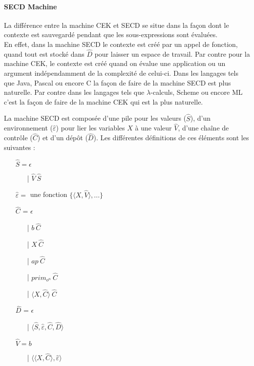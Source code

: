 \documentclass[10pt,a4paper]{report}
\begin{document}
	\newpage
	
	
	\paragraph{SECD Machine}
	
	La différence entre la machine CEK et SECD se situe dans la façon dont le contexte est sauvegardé pendant que les sous-expressions sont évaluées.\\
	En effet, dans la machine SECD le contexte est créé par un appel de fonction, quand tout est stocké dans $\widehat{D}$ pour laisser un espace de travail. Par contre pour la machine CEK, le contexte est créé quand on évalue une application ou un argument indépendamment de la complexité de celui-ci.
	\smallbreak 
	Dans les langages tels que Java, Pascal ou encore C la façon de faire de la machine SECD est plus naturelle. Par contre  dans les langages tels que $\lambda$-calculs, Scheme ou encore ML c'est la façon de faire de la machine CEK qui est la plus naturelle.
	\medbreak
	
	La machine SECD est composée d'une pile pour les valeurs ($\widehat{S}$), d'un environnement ($\widehat{\varepsilon}$) pour lier les variables $X$ à une valeur $\widehat{V}$, d'une chaîne de contrôle ($\widehat{C}$) et d'un dépôt ($\widehat{D}$). Les différentes définitions de ces éléments sont les suivantes :
	\smallbreak
	\begin{itemize}
		\item[] $\widehat{S} = \epsilon$ 
		\begin{itemize}
			\item[|] $\widehat{V}~\widehat{S}$
		\end{itemize}
		\item[] $\widehat{\varepsilon} =$ une fonction $\{\langle X,\widehat{V}\rangle,...\}$
		\item[] $\widehat{C}$ = $\epsilon$ 
		\begin{itemize}
			\item[|] $b~\widehat{C}$
			\item[|] $X~\widehat{C}$
			\item[|] $ap~\widehat{C}$
			\item[|] $prim_{o^{n}}~\widehat{C}$
			\item[|] $\langle X,\widehat{C}\rangle~\widehat{C}$
		\end{itemize}
		\item[] $\widehat{D}$ = $\epsilon$
		\begin{itemize}
			\item[|] $\langle\widehat{S},\widehat{\varepsilon},\widehat{C},\widehat{D}\rangle$
		\end{itemize}
		\item[] $\widehat{V} = b$
		\begin{itemize}
			\item[|] $\langle\langle X,\widehat{C}\rangle,\widehat{\varepsilon}\rangle$
		\end{itemize}
	\end{itemize}
	\bigbreak
	
\end{document}
